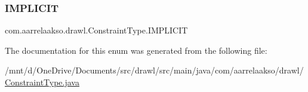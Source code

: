 \subsubsection{\texorpdfstring{I\+M\+P\+L\+I\+C\+IT}{IMPLICIT}}
{\footnotesize\ttfamily com.\+aarrelaakso.\+drawl.\+Constraint\+Type.\+I\+M\+P\+L\+I\+C\+IT}



The documentation for this enum was generated from the following file\+:\begin{DoxyCompactItemize}
\item 
/mnt/d/\+One\+Drive/\+Documents/src/drawl/src/main/java/com/aarrelaakso/drawl/\hyperlink{_constraint_type_8java}{Constraint\+Type.\+java}\end{DoxyCompactItemize}
